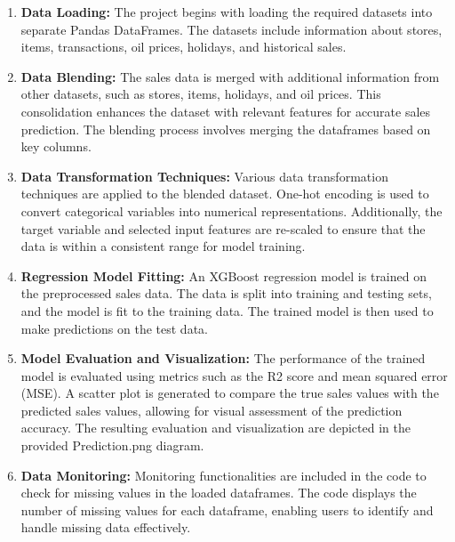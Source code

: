 \begin{enumerate}
	\item \textbf{Data Loading:} The project begins with loading the required datasets into separate Pandas DataFrames. The datasets include information about stores, items, transactions, oil prices, holidays, and historical sales.
	
	\item \textbf{Data Blending:} The sales data is merged with additional information from other datasets, such as stores, items, holidays, and oil prices. This consolidation enhances the dataset with relevant features for accurate sales prediction. The blending process involves merging the dataframes based on key columns.
	
	\item \textbf{Data Transformation Techniques:} Various data transformation techniques are applied to the blended dataset. One-hot encoding is used to convert categorical variables into numerical representations. Additionally, the target variable and selected input features are re-scaled to ensure that the data is within a consistent range for model training.
	
	\item \textbf{Regression Model Fitting:} An XGBoost regression model is trained on the preprocessed sales data. The data is split into training and testing sets, and the model is fit to the training data. The trained model is then used to make predictions on the test data.
	
	\item \textbf{Model Evaluation and Visualization:} The performance of the trained model is evaluated using metrics such as the R2 score and mean squared error (MSE). A scatter plot is generated to compare the true sales values with the predicted sales values, allowing for visual assessment of the prediction accuracy. The resulting evaluation and visualization are depicted in the provided Prediction.png diagram.
	
	\item \textbf{Data Monitoring:} Monitoring functionalities are included in the code to check for missing values in the loaded dataframes. The code displays the number of missing values for each dataframe, enabling users to identify and handle missing data effectively.  
\end{enumerate}


